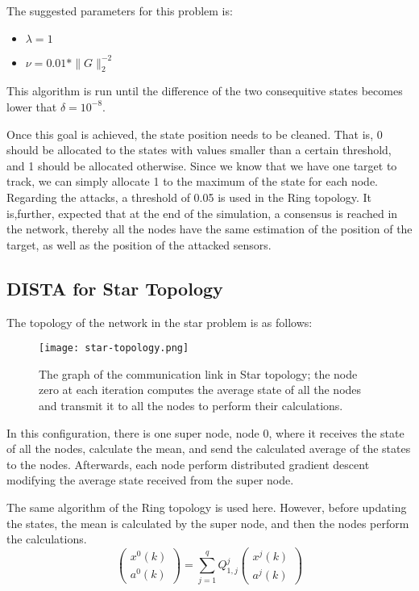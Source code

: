 The suggested parameters for this problem is:
\begin{itemize}
	\item $\lambda = 1$
	\item $\nu = 0.01*\|G\|_2^{-2}$
\end{itemize}

This algorithm is run until the difference of the two consequitive states becomes lower that $\delta = 10^{-8}$.

Once this goal is achieved, the state position needs to be cleaned. That is, 0 should be allocated to the states with values smaller than a certain threshold, and 1 should be allocated otherwise. Since we know that we have one target to track, we can simply allocate 1 to the maximum of the state for each node. Regarding the attacks, a threshold of 0.05 is used in the Ring topology. It is,further, expected that at the end of the simulation, a consensus is reached in the network, thereby all the nodes have the same estimation of the position of the target, as well as the position of the attacked sensors.

\subsection{DISTA for Star Topology}
The topology of the network in the star problem is as follows:
\begin{figure}[H] %
    \centering
    \texttt{[image: star-topology.png]} %
    \caption{The graph of the communication link in Star topology; the node zero at each iteration computes the average state of all the nodes and transmit it to all the nodes to perform their calculations.}
\end{figure}
In this configuration, there is one super node, node 0, where it receives the state of all the nodes, calculate the mean, and send the calculated average of the states to the nodes. Afterwards, each node perform distributed gradient descent modifying the average state received from the super node.

The same algorithm of the Ring topology is used here. However, before updating the states, the mean is calculated by the super node, and then the nodes perform the calculations.
\begin{equation}
\begin{pmatrix}
x^{0}(k) \\
a^{0}(k)
\end{pmatrix} = \sum_{j=1}^{q} Q_{1,j}^{j} \begin{pmatrix}
x^{j}(k) \\
a^{j}(k)
\end{pmatrix}
\end{equation}

